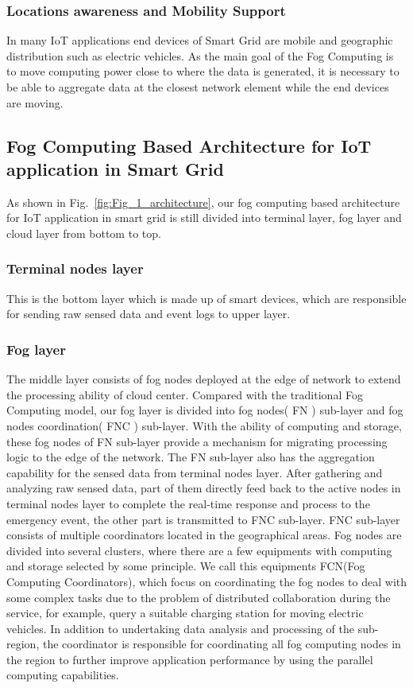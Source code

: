 \documentclass[conference]{IEEEtran}
\begin{document}
\subsubsection{Locations awareness and Mobility Support} In many IoT applications end devices of Smart Grid are mobile and geographic distribution such as electric vehicles. As the main goal of the Fog Computing is to move computing power close to where the data is generated, it is necessary to be able to aggregate data at the closest network element while the end devices are moving.


\subsection{Fog Computing Based Architecture for IoT application in Smart Grid}
As shown in Fig.~\ref{fig:Fig_1_architecture}, our fog computing based architecture for IoT application in smart grid is still divided into terminal layer, fog layer and cloud layer from bottom to top. 
\subsubsection{Terminal nodes layer} This is the bottom layer which is made up of smart devices, which are responsible for sending raw sensed data and event logs to upper layer.
\subsubsection{Fog layer} The middle layer consists of fog nodes deployed at the edge of network to extend the processing ability of cloud center. Compared with the traditional Fog Computing model, our fog layer is divided into fog nodes( FN ) sub-layer and fog nodes coordination( FNC ) sub-layer. With the ability of computing and storage, these fog nodes of FN sub-layer provide a mechanism for migrating processing logic to the edge of the network. The FN sub-layer also has the aggregation capability for the sensed data from terminal nodes layer. After gathering and analyzing raw sensed data, part of them directly feed back to the active nodes in terminal nodes layer to complete the real-time response and process to the emergency event, the other part is transmitted to FNC sub-layer. FNC sub-layer consists of multiple coordinators located in the geographical areas. Fog nodes are divided into several clusters, where there are a few equipments  with computing and storage selected by some principle. We call this equipments FCN(Fog Computing Coordinators), which focus on coordinating the fog nodes to deal with some complex tasks due to the problem of distributed collaboration during the service, for example, query a suitable charging station for moving electric vehicles. In addition to undertaking data analysis and processing of the sub-region, the coordinator is responsible for coordinating all fog computing nodes in the region to further improve application performance by using the parallel computing capabilities.
\end{document}
